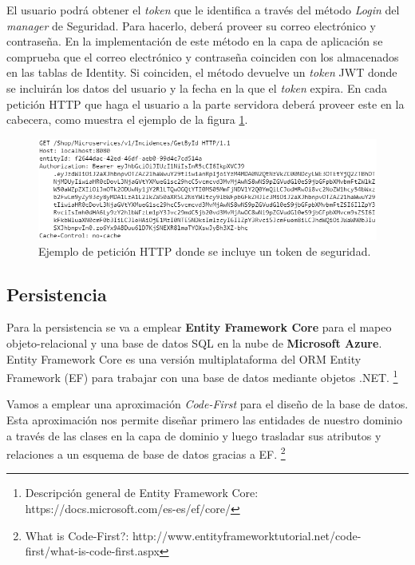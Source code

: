 \documentclass[11pt,spanish,listoffigures]{tfgetsinf}
\begin{document}
\begin{itemize}
\end{itemize}

El usuario podrá obtener el \textit{token} que le identifica a través del método \textit{Login} del \textit{manager} de Seguridad. Para hacerlo, deberá proveer su correo electrónico y contraseña. En la implementación de este método en la capa de aplicación se comprueba que el correo electrónico y contraseña coinciden con los almacenados en las tablas de Identity. Si coinciden, el método devuelve un \textit{token} JWT donde se incluirán los datos del usuario y la fecha en la que el \textit{token} expira. En cada petición HTTP que haga el usuario a la parte servidora deberá proveer este en la cabecera, como muestra el ejemplo de la figura \ref{fig:http}.

\begin{figure}[h]
\centering
\includegraphics[scale=0.8]{http}
\caption{Ejemplo de petición HTTP donde se incluye un token de seguridad.}
\label{fig:http}
\end{figure}

\newpage

\subsection{Persistencia} \label{subsect:Persistencia}

Para la persistencia se va a emplear \textbf{Entity Framework Core} para el mapeo objeto-relacional y una base de datos SQL en la nube de \textbf{Microsoft Azure}. Entity Framework Core es una versión multiplataforma del ORM Entity Framework (EF) para trabajar con una base de datos mediante objetos .NET. \footnote{Descripción general de Entity Framework Core: https://docs.microsoft.com/es-es/ef/core/}

Vamos a emplear una aproximación \textit{Code-First} para el diseño de la base de datos. Esta aproximación nos permite diseñar primero las entidades de nuestro dominio a través de las clases en la capa de dominio y luego trasladar sus atributos y relaciones a un esquema de base de datos gracias a EF. \footnote{What is Code-First?: http://www.entityframeworktutorial.net/code-first/what-is-code-first.aspx}
\end{document}

